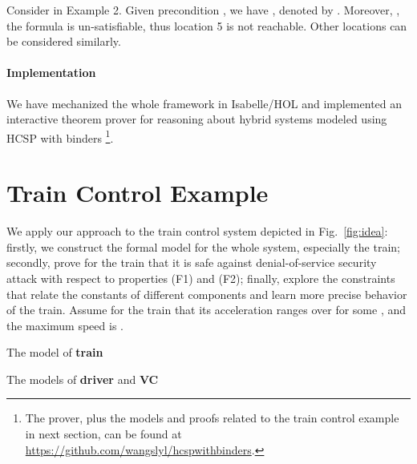 \documentclass{llncs}
\begin{document}
\example
Consider  in Example 2. Given precondition  , we have
,
denoted by . Moreover,
, the formula  is un-satisfiable, thus location 5 is not reachable.
Other locations can be considered similarly. 


\paragraph{\textbf{Implementation}}
We have mechanized the whole framework  in Isabelle/HOL and implemented an interactive theorem prover for
reasoning about hybrid systems modeled using HCSP with binders \footnote{The prover, plus the models and proofs related to the train control example in next section,  can be found at \url{https://github.com/wangslyl/hcspwithbinders}.}.




\section{Train Control Example}
\label{sec:application}
We apply our approach to the train control system  depicted in Fig.~\ref{fig:idea}: firstly, we
construct the formal model for the whole system, especially the train;
secondly,  prove for the train that it is safe against denial-of-service security attack  with respect
to properties (F1) and (F2); finally, explore  the constraints that
relate the constants of different components and learn more precise behavior of
the train.
Assume for the train that
its acceleration ranges over  for some , and the maximum speed
is  .

\begin{table}[t]
\small
\centering

\caption{The model of \textbf{train}}
\label{trainmodell}
\end{table}

\begin{table}[t]
\small
\begin{minipage}{0.5\linewidth}
\centering

\end{minipage}
\begin{minipage}{0.5\linewidth}
\centering

\end{minipage}
\caption{The models of \textbf{driver} and \textbf{VC}}
\label{driverevc}
\end{table}
\end{document}

